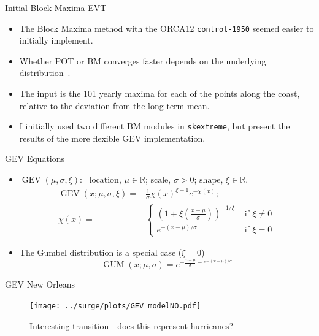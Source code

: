\begin{frame}{Initial Block Maxima EVT }
  \begin{itemize}
    \item The Block Maxima method with the ORCA12
    \texttt{control-1950} seemed easier to initially implement.
    \item Whether POT or BM converges faster depends
          on the underlying distribution~\cite{bucher2018horse}.
    \item The input is the 101 yearly maxima for each of the points along the coast,
         relative to the deviation from the long term mean.
    \item I initially used two different BM modules in \texttt{skextreme}, but present the
          results of the more flexible GEV implementation.
  \end{itemize}
\end{frame}



    \begin{frame}{GEV Equations }
    \begin{itemize}
\item
\(
\operatorname{GEV}(\mu, \sigma, \xi):
\)
\(
\text{ location, } \mu \in \mathbb{R}
\text{; scale, } \sigma>0
\text{; shape, } \xi \in \mathbb{R}.
\)
\begin{eqnarray}
\operatorname{GEV}(x; \mu, \sigma, \xi)=&
\frac{1}{\sigma} \chi(x)^{\xi+1} e^{-\chi(x)};\\
\chi(x)=&\left\{\begin{array}{ll}
\left(1+\xi\left(\frac{x-\mu}{\sigma}\right)\right)^{-1 / \xi} & \text { if } \xi \neq 0 \\
e^{-(x-\mu) / \sigma} & \text { if } \xi=0
\end{array}\right.
\end{eqnarray}
\item The Gumbel distribution is a special case ($\xi=0$)
\begin{equation}
\operatorname{GUM}(x ; \mu, \sigma)=e^{-\frac{x-\mu}{\sigma}-e^{-(x-\mu) / \sigma}}
\end{equation}
\end{itemize}
\end{frame}


\begin{frame}{GEV New Orleans}
\vspace{-20pt}
 \begin{minipage}{1.0\textwidth}
\begin{figure}[htb!]
    \centering
    \texttt{[image: ../surge/plots/GEV\_modelNO.pdf]}
    \vspace{-25pt}
   \caption{Interesting transition - does this represent hurricanes?}
    \label{fig:}
\end{figure}
\end{minipage}
\end{frame}


